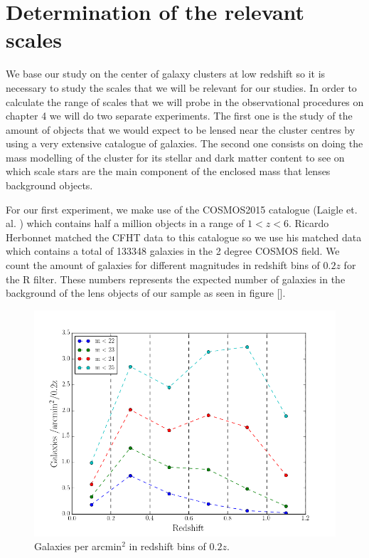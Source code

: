 \chapter{Determination of the relevant scales}

We base our study on the center of galaxy clusters at low redshift so it is necessary to study the scales that we will be relevant for our studies. In order to calculate the range of scales that we will probe in the observational procedures on chapter 4 we will do two separate experiments. The first one is the study of the amount of objects that we would expect to be lensed near the cluster centres by using a very extensive catalogue of galaxies. The second one consists on doing the mass modelling of the cluster for its stellar and dark matter content to see on which scale stars are the main component of the enclosed mass that lenses background objects.

For our first experiment, we make use of the COSMOS2015 catalogue (Laigle et. al. \citeyear{Reference21}) which contains half a million objects in a range of $1<z<6$. Ricardo Herbonnet matched the CFHT data to this catalogue so we use his matched data which contains a total of 133348 galaxies in the 2 degree COSMOS field. We count the amount of galaxies for different magnitudes in redshift bins of $0.2z$ for the R filter. These numbers represents the expected number of galaxies in the background of the lens objects of our sample as seen in figure []. 

\begin{figure}[H]
\centering
\includegraphics[width=12cm]{images/galaxies_per_arcmin.png}
\caption[Galaxies per arcmin]{Galaxies per arcmin$^2$ in redshift bins of $0.2z$. }
\end{figure}

